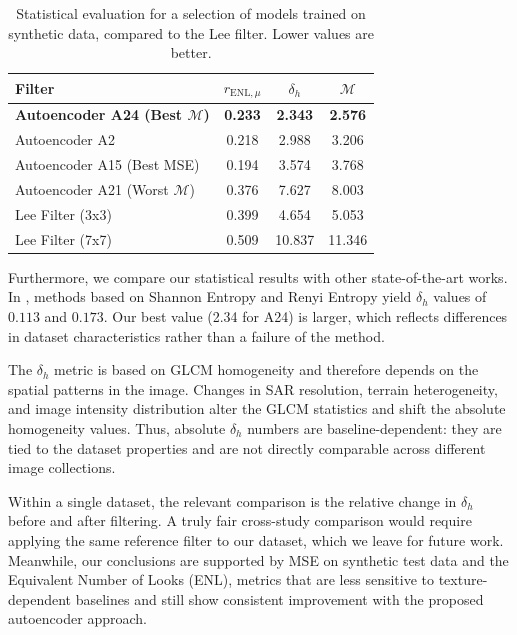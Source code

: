 \begin{table}[h!]
\centering
\caption{Statistical evaluation for a selection of models trained on synthetic data, compared to the Lee filter. Lower values are better.}
\label{tab:stat_results_A}
\vspace{3mm}
\scriptsize
\renewcommand{\arraystretch}{1.15}
\begin{tabular}{|l|c|c|c|}
\hline
\textbf{Filter} & \textbf{$r_{\text{ENL},\mu}$} & \textbf{$\delta_h$} & \textbf{$\mathcal{M}$} \\
\hline
\textbf{Autoencoder A24 (Best $\mathcal{M}$)} & \textbf{0.233} & \textbf{2.343} & \textbf{2.576} \\
Autoencoder A2 & 0.218 & 2.988 & 3.206 \\
Autoencoder A15 (Best MSE) & 0.194 & 3.574 & 3.768 \\
Autoencoder A21 (Worst $\mathcal{M}$) & 0.376 & 7.627 & 8.003 \\
\hline
Lee Filter (3x3) & 0.399 & 4.654 & 5.053 \\
Lee Filter (7x7) & 0.509 & 10.837 & 11.346 \\
\hline
\end{tabular}
\end{table}

Furthermore, we compare our statistical results with other state-of-the-art works. In \cite{chan2022entropy}, methods based on Shannon Entropy and Renyi Entropy yield $\delta_h$ values of $0.113$ and $0.173$. Our best value (2.34 for A24) is larger, which reflects differences in dataset characteristics rather than a failure of the method.

The $\delta_h$ metric is based on GLCM homogeneity and therefore depends on the spatial patterns in the image. Changes in SAR resolution, terrain heterogeneity, and image intensity distribution alter the GLCM statistics and shift the absolute homogeneity values. Thus, absolute $\delta_h$ numbers are baseline-dependent: they are tied to the dataset properties and are not directly comparable across different image collections.

Within a single dataset, the relevant comparison is the relative change in $\delta_h$ before and after filtering. A truly fair cross-study comparison would require applying the same reference filter to our dataset, which we leave for future work. Meanwhile, our conclusions are supported by MSE on synthetic test data and the Equivalent Number of Looks (ENL), metrics that are less sensitive to texture-dependent baselines and still show consistent improvement with the proposed autoencoder approach.
